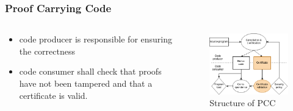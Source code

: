 \documentclass[10pt,t]{beamer}
\begin{document}
\begin{frame}[c]
  \frametitle{Proof Carrying Code}
  \begin{columns}[onlytextwidth]
    \begin{column}{0.4\textwidth}
      \begin{itemize}
        \item code producer is responsible for ensuring the correctness
        \item code consumer shall check that proofs have not been tampered and
              that a certificate is valid.
      \end{itemize}
    \end{column}
    \hfill
      \begin{column}{0.6\textwidth}
      \begin{figure}
        \includegraphics[width=\textwidth]{pccimg.png}
        \caption{Structure of PCC}
      \end{figure}
    \end{column}
  \end{columns}
\end{frame}
\end{document}
